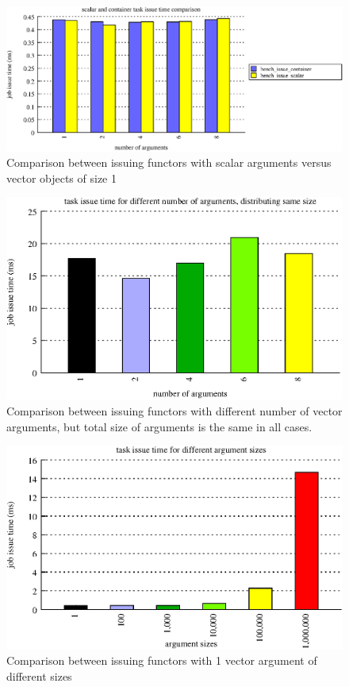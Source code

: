 \begin{figure}[!ht]
\includegraphics[width=\columnwidth]{figures/job_issue_time_scalar_vs_container_bars}
\caption{Comparison between issuing functors with scalar arguments versus vector objects of size 1}
\label{fig:issue_time_scalar_vs_containers}
\end{figure}

\begin{figure}[!ht]
\includegraphics[width=\columnwidth]{figures/job_issue_time_different_argnums_same_size_bars}
\caption{Comparison between issuing functors with different number of vector arguments, but total 
				size of arguments is the same in all cases.}
\label{fig:issue_time_different_argnum_same_size}
\end{figure}

\begin{figure}[!ht]
\includegraphics[width=\columnwidth]{figures/job_issue_time_different_argsizes}
\caption{Comparison between issuing functors with 1 vector argument of different sizes}
\label{fig:job_issue_time_different_argsizes}
\end{figure}

